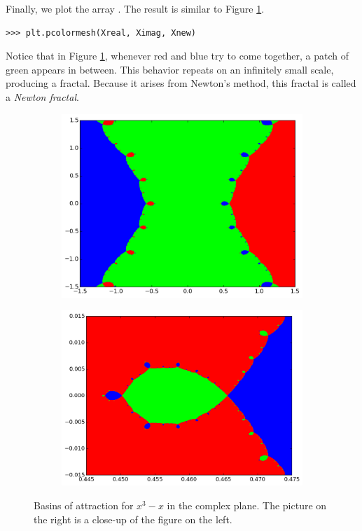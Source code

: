 Finally, we plot the array . The result is similar to Figure \ref{fig:fractal_ex}.
\begin{lstlisting}
>>> plt.pcolormesh(Xreal, Ximag, Xnew)
\end{lstlisting}

Notice that in Figure \ref{fig:fractal_ex}, whenever red and blue try to come together, a patch of green appears in between.
This behavior repeats on an infinitely small scale, producing a fractal.
Because it arises from Newton's method, this fractal is called a \emph{Newton fractal}.

\begin{figure}
\begin{center}
\begin{subfigure}[b]{.49\textwidth}
\centering
\includegraphics[width=\textwidth]{fractal_ex}
\end{subfigure}
\begin{subfigure}[b]{.49\textwidth}
\centering
\includegraphics[width=\textwidth]{fractal_zoom}
\end{subfigure}
\caption{ Basins of attraction for $x^3-x$ in the complex plane. 
The picture on the right is a close-up of the figure on the left.}
\label{fig:fractal_ex}
\end{center}
\end{figure}

